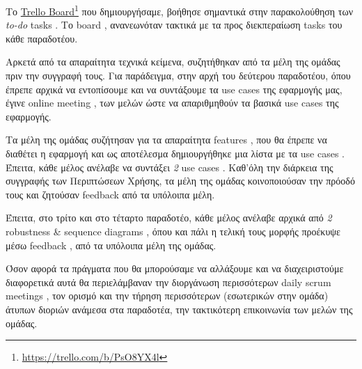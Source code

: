 \documentclass{../ol-softwaremanual}
\newcommand{\doclink}[2]{\href{#1}{#2}\footnote{\url{#1}}}
\begin{document}
	Το \en \doclink{https://trello.com/b/PsO8YX4l}{Trello Board} \gr που δημιουργήσαμε, βοήθησε σημαντικά στην παρακολούθηση των \en \textit{to-do} tasks \gr. Το \en board \gr, ανανεωνόταν τακτικά με τα προς διεκπεραίωση \en tasks \gr του κάθε παραδοτέου. \break
	
	Αρκετά από τα απαραίτητα τεχνικά κείμενα, συζητήθηκαν από τα μέλη της ομάδας πριν την συγγραφή τους. Για παράδειγμα, στην αρχή του δεύτερου παραδοτέου, όπου έπρεπε αρχικά να εντοπίσουμε και να συντάξουμε τα \en use cases \gr της εφαρμογής μας, έγινε \en online meeting \gr, των μελών ώστε να απαριθμηθούν τα βασικά \en use cases \gr της εφαρμογής. \break
	
	Τα μέλη της ομάδας συζήτησαν για τα απαραίτητα \en features \gr, που θα έπρεπε να διαθέτει η εφαρμογή και ως αποτέλεσμα δημιουργήθηκε μια λίστα με τα \en use cases \gr. Έπειτα, κάθε μέλος ανέλαβε να συντάξει \textit{2} \en use cases \gr. Καθ'όλη την διάρκεια της συγγραφής των Περιπτώσεων Χρήσης, τα μέλη της ομάδας κοινοποιούσαν την πρόοδό τους και ζητούσαν \en feedback \gr από τα υπόλοιπα μέλη. \break
	
	Έπειτα, στο τρίτο και στο τέταρτο παραδοτέο, κάθε μέλος ανέλαβε αρχικά από \textit{2} \en robustness \& sequence diagrams \gr, όπου και πάλι η τελική τους μορφής προέκυψε μέσω \en feedback \gr, από τα υπόλοιπα μέλη της ομάδας. \break
	
	Όσον αφορά τα πράγματα που θα μπορούσαμε να αλλάξουμε και να διαχειριστούμε διαφορετικά αυτά θα περιελάμβαναν την διοργάνωση περισσότερων \en daily scrum meetings \gr, τον ορισμό και την τήρηση περισσότερων (εσωτερικών στην ομάδα) άτυπων διοριών ανάμεσα στα παραδοτέα, την τακτικότερη επικοινωνία των μελών της ομάδας.
\end{document}
